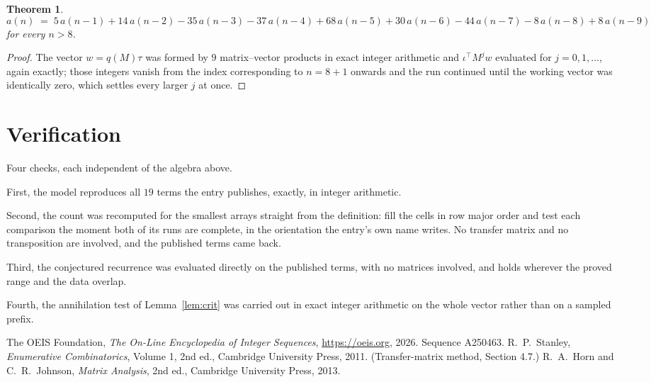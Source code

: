 \documentclass[11pt,a4paper]{article}
\theoremstyle{plain}
\newtheorem{theorem}{Theorem}
\theoremstyle{definition}
\begin{document}
\begin{theorem}
\[
a(n)\;=\;5\,a(n-1) + 14\,a(n-2) - 35\,a(n-3) - 37\,a(n-4) + 68\,a(n-5) + 30\,a(n-6) - 44\,a(n-7) - 8\,a(n-8) + 8\,a(n-9)
\]
for every $n>8$.
\end{theorem}

\begin{proof}
The vector $w=q(M)\tau$ was formed by $9$ matrix--vector products in exact integer
arithmetic and $\iota^{\!\top}M^{j}w$ evaluated for $j=0,1,\dots$, again exactly; those
integers vanish from the index corresponding to $n=8+1$ onwards and the run continued
until the working vector was identically zero, which settles every larger $j$ at once.
\end{proof}

\section{Verification}

Four checks, each independent of the algebra above.

First, the model reproduces all $19$ terms the entry publishes, exactly, in integer
arithmetic.

Second, the count was recomputed for the smallest arrays straight from the definition: fill the
cells in row major order and test each comparison the moment both of its runs are complete,
in the orientation the entry's own name writes. No transfer matrix and no transposition are
involved, and the published terms came back.

Third, the conjectured recurrence was evaluated directly on the published terms, with no
matrices involved, and holds wherever the proved range and the data overlap.

Fourth, the annihilation test of Lemma~\ref{lem:crit} was carried out in exact integer
arithmetic on the whole vector rather than on a sampled prefix.

\begin{thebibliography}{9}
 The OEIS Foundation, \emph{The On-Line Encyclopedia of Integer
Sequences}, \url{https://oeis.org}, 2026. Sequence A250463.
 R.~P.~Stanley, \emph{Enumerative Combinatorics}, Volume 1, 2nd ed.,
Cambridge University Press, 2011. (Transfer-matrix method, Section 4.7.)
 R.~A.~Horn and C.~R.~Johnson, \emph{Matrix Analysis}, 2nd ed., Cambridge
University Press, 2013.
\end{thebibliography}
\end{document}
